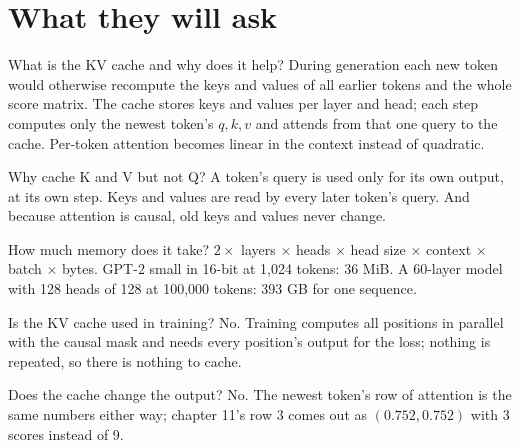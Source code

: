\section{What they will ask}

\begin{iq}[\core]{What is the KV cache and why does it help?}
During generation each new token would otherwise recompute the keys and values of all earlier tokens and the whole score matrix. The cache stores keys and values per layer and head; each step computes only the newest token's $q, k, v$ and attends from that one query to the cache. Per-token attention becomes linear in the context instead of quadratic.
\end{iq}

\begin{iq}[\core]{Why cache K and V but not Q?}
A token's query is used only for its own output, at its own step. Keys and values are read by every later token's query. And because attention is causal, old keys and values never change.
\end{iq}

\begin{iq}[\core]{How much memory does it take?}
$2 \times$ layers $\times$ heads $\times$ head size $\times$ context $\times$ batch $\times$ bytes. GPT-2 small in 16-bit at 1,024 tokens: 36 MiB. A 60-layer model with 128 heads of 128 at 100,000 tokens: 393 GB for one sequence.
\end{iq}

\begin{iq}{Is the KV cache used in training?}
No. Training computes all positions in parallel with the causal mask and needs every position's output for the loss; nothing is repeated, so there is nothing to cache.
\end{iq}

\begin{iq}{Does the cache change the output?}
No. The newest token's row of attention is the same numbers either way; chapter 11's row 3 comes out as $(0.752, 0.752)$ with 3 scores instead of 9.
\end{iq}
